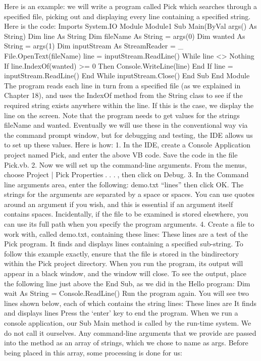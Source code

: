 Here is an example: we will write a program called Pick which searches through a speciﬁed ﬁle, picking out and displaying every line containing a speciﬁed string. Here is the code:
Imports System.IO
Module Module1
	Sub Main(ByVal args() As String)
		Dim line As String
		Dim fileName As String = args(0)
		Dim wanted As String = args(1)
		Dim inputStream As StreamReader = _
			File.OpenText(fileName)
		line = inputStream.ReadLine()
		While line <> Nothing
			If line.IndexOf(wanted) >= 0 Then
				Console.WriteLine(line)
			End If
			line = inputStream.ReadLine()
		End While
		inputStream.Close()
	End Sub
End Module
The program reads each line in turn from a speciﬁed ﬁle (as we explained in Chapter 18), and uses the IndexOf method from the String class to see if the required string exists anywhere within the line. If this is the case, we display the line on the screen.
Note that the program needs to get values for the strings fileName and wanted. Eventually we will use these in the conventional way via the command prompt window, but for debugging and testing, the IDE allows us to set up these values. Here is 
how:
1.	In the IDE, create a Console Application project named Pick, and enter the above VB code. Save the code in the ﬁle Pick.vb.
2.	Now we will set up the command-line arguments. From the menus, choose Project | Pick Properties . . . , then click on Debug.
3.	In the Command line arguments area, enter the following:
demo.txt “lines”
	then click OK. The strings for the arguments are separated by a space or spaces. You can use quotes around an argument if you wish, and this is essential if an argument itself contains spaces. Incidentally, if the ﬁle to be examined is stored elsewhere, you can use its full path when you specify the program arguments.
4.	Create a ﬁle to work with, called demo.txt, containing these lines:
These lines are
a test of the Pick program.
It finds and displays lines
containing a specified sub-string.
	To follow this example exactly, ensure that the ﬁle is stored in the bin\Debug directory within the Pick project directory.
When you run the program, its output will appear in a black window, and the window will close. To see the output, place the following line just above the End Sub, as we did in the Hello program:
Dim wait As String = Console.ReadLine()
Run the program again. You will see two lines shown below, each of which contains the string lines:
These lines are
It finds and displays lines
Press the ‘enter’ key to end the program.
When we run a console application, our Sub Main method is called by the run-time system. We do not call it ourselves. Any command-line arguments that we provide are passed into the method as an array of strings, which we chose to name as args. Before being placed in this array, some processing is done for us:
